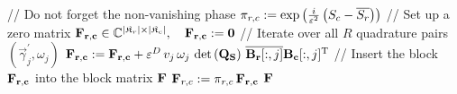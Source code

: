 \begin{algorithm}
\begin{algorithmic}
      \STATE // Do not forget the non-vanishing phase
      \STATE $\pi_{r,c} := \exp\left( \frac{i}{\varepsilon^2}\left(S_c - \overline{S_r}\right) \right)$
      \STATE // Set up a zero matrix
      \STATE $\mathbf{F_{r,c}} \in \mathbb{C}^{|\mathfrak{K}_r| \times |\mathfrak{K}_c|}, \quad \mathbf{F_{r,c}} := \mathbf{0}$
      \STATE // Iterate over all $R$ quadrature pairs $\left(\vec{\gamma}^\prime_j, \omega_j\right)$
        \STATE $\mathbf{F_{r,c}} := \mathbf{F_{r,c}} + \varepsilon^D \, v_j \, \omega_j \, \det\left(\mathbf{Q_S}\right) \, \overline{\mathbf{B_r}[:,j]} \mathbf{B_c}[:,j]{}^{\textnormal{T}}$
      \ENDFOR
      \STATE // Insert the block $\mathbf{F_{r,c}}$ into the block matrix $\mathbf{F}$
      \STATE $\mathbf{F}_{r,c} := \pi_{r,c} \, \mathbf{F_{r,c}}$
    \ENDFOR
  \ENDFOR
  \RETURN $\mathbf{F}$
\end{algorithmic}
\end{algorithm}


